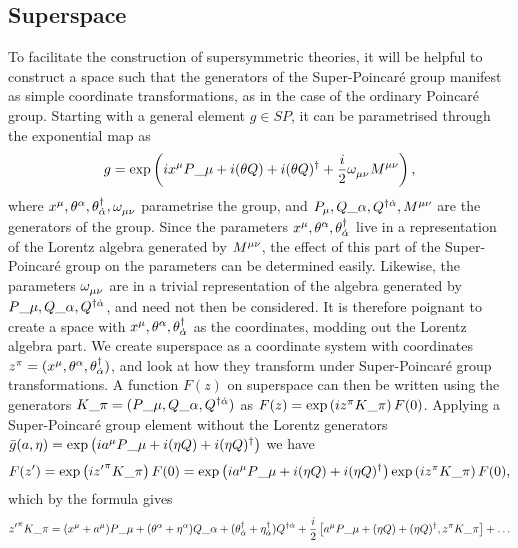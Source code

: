 \documentclass[../main.tex]{subfiles}
\begin{document}
\subsection{Superspace}
To facilitate the construction of supersymmetric theories, it will be helpful
to construct a space such that the generators of the Super-Poincaré group
manifest as simple coordinate transformations, as in the case of the ordinary
Poincaré group. Starting with a general element \(g \in SP\), it can be
parametrised through the exponential map as
\begin{equation}
    g = \exptext{ix\^{\mu} P\_{\mu} + i(\theta Q) + i (\theta Q)^\dagger + \frac{i}{2}\tensor{\omega}{_\mu_\nu}\tensor{M}{^\mu^\nu}},
\end{equation}
where \(x^\mu, \theta\^{\alpha}, \theta\indices*{^\dagger_{\dot\alpha}}, \tensor{\omega}{_\mu_\nu}\) parametrise the group, and \(P_\mu, Q\_{\alpha}, Q\indices*{^\dagger^{\dot\alpha}}, \tensor{M}{^\mu^\nu}\) are the generators of the group.
Since the parameters \(x\^{\mu}, \theta\^{\alpha}, \theta\indices*{^\dagger_{\dot\alpha}}\) live in a representation of the Lorentz algebra generated by \(\tensor{M}{^\mu^\nu}\), the effect of this part of the Super-Poincaré group on the parameters can be determined easily.
Likewise, the parameters \(\tensor{\omega}{_\mu_\nu}\) are in a trivial representation of the algebra generated by \(P\_{\mu}, Q\_{\alpha}, Q\indices*{^\dagger^{\dot\alpha}}\), and need not then be considered.
It is therefore poignant to create a space with \(x\^{\mu}, \theta\^{\alpha}, \theta\indices*{^\dagger_{\dot\alpha}}\) as the coordinates, modding out the Lorentz algebra part.
We create superspace as a coordinate system with coordinates \(z\^{\pi} = (x\^{\mu}, \theta\^{\alpha}, \theta\indices*{^\dagger_{\dot\alpha}})\), and look at how they transform under Super-Poincaré group transformations.
A function \(F(z)\) on superspace can then be written using the generators \(K\_\pi = (P\_\mu, Q\_\alpha, Q\indices*{^\dagger^{\dot\alpha}})\) as \(F(z) = \exptext{iz\^\pi K\_\pi} F(0)\).
Applying a Super-Poincaré group element without the Lorentz generators \(\bar{g}(a, \eta) = \exptext{ia\^\mu P\_\mu + i (\eta Q) + i (\eta Q)^\dagger}\) we have
\begin{equation}
    F(z^\prime) = \exptext{i{z^\prime}\^\pi K\_\pi} F(0) = \exptext{ia\^\mu P\_\mu + i (\eta Q) + i (\eta Q)^\dagger} \exptext{iz\^\pi K\_\pi} F(0),
\end{equation}
which by the  formula gives
\begin{equation}
    {z^\prime}\^\pi K\_\pi = (x\^\mu + a\^\mu) P\_\mu + (\theta\^\alpha + \eta\^\alpha)Q\_\alpha + (\theta\indices*{^\dagger_{\dot\alpha}} + \eta\indices*{^\dagger_{\dot\alpha}})Q\indices*{^\dagger^{\dot\alpha}} + \frac{i}{2}\bclosed{a\^\mu P\_\mu + (\eta Q) + (\eta Q)^\dagger, z\^\pi K\_\pi} + \ldots
\end{equation}
\end{document}
